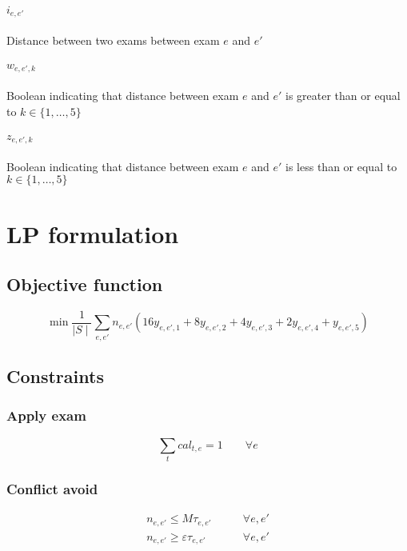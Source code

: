 \documentclass[11pt, a4paper, leqno]{article}
\begin{document}
	\paragraph{$i_{e,e'}$} Distance between two exams between exam $e$ and $e'$
	
	\paragraph{$w_{e,e',k}$} Boolean indicating that distance between exam $e$ and $e'$ is greater than or equal to $k \in \{1,\dots,5\}$ %
	
	\paragraph{$z_{e,e',k}$} Boolean indicating that distance between exam $e$ and $e'$ is less than or equal to $k \in \{1,\dots,5\}$
	
	\section{LP formulation}
	
	\subsection{Objective function}
	
	\[
		\min\frac{1}{\mid S\mid}\sum_{e,e'} n_{e,e'}\left(16y_{e,e',1}+8y_{e,e',2}+4y_{e,e',3}+2y_{e,e',4}+y_{e,e',5}\right)
	\]
	
	\subsection{Constraints}
	
	\subsubsection{Apply exam}
	
	\[
		\sum_{t} cal_{t,e} = 1 \qquad\forall e
	\]
	
	\subsubsection{Conflict avoid}
	
	\begin{align*}
		n_{e,e'} \leq M\tau_{e,e'} &\qquad \forall e,e' \\
		n_{e,e'} \geq \varepsilon\tau_{e,e'} &\qquad \forall e,e'
	\end{align*}
\end{document}
